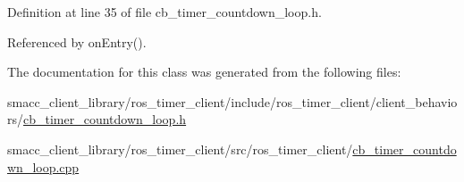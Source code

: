 Definition at line 35 of file cb\+\_\+timer\+\_\+countdown\+\_\+loop.\+h.



Referenced by on\+Entry().



The documentation for this class was generated from the following files\+:\begin{DoxyCompactItemize}
\item 
smacc\+\_\+client\+\_\+library/ros\+\_\+timer\+\_\+client/include/ros\+\_\+timer\+\_\+client/client\+\_\+behaviors/\hyperlink{cb__timer__countdown__loop_8h}{cb\+\_\+timer\+\_\+countdown\+\_\+loop.\+h}\item 
smacc\+\_\+client\+\_\+library/ros\+\_\+timer\+\_\+client/src/ros\+\_\+timer\+\_\+client/\hyperlink{cb__timer__countdown__loop_8cpp}{cb\+\_\+timer\+\_\+countdown\+\_\+loop.\+cpp}\end{DoxyCompactItemize}
